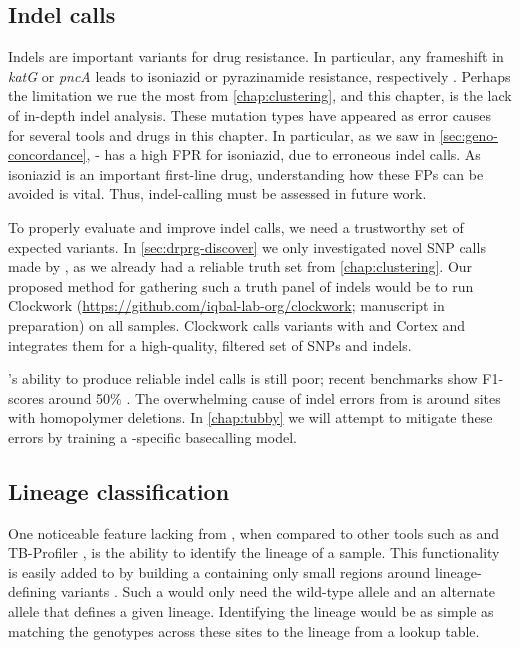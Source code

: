 \subsection{Indel calls}
\label{sec:indel-dst-fw}
Indels are important variants for \mtb{} drug resistance. In particular, any frameshift in \textit{katG} or \textit{pncA} leads to isoniazid or pyrazinamide resistance, respectively \cite{miotto2017}. Perhaps the limitation we rue the most from \autoref{chap:clustering}, and this chapter, is the lack of in-depth indel analysis. These mutation types have appeared as error causes for several tools and drugs in this chapter. In particular, as we saw in \autoref{sec:geno-concordance}, \mykrobe{}-\ont{} has a high FPR for isoniazid, due to erroneous indel calls. As isoniazid is an important first-line drug, understanding how these FPs can be avoided is vital. Thus, indel-calling must be assessed in future work.

To properly evaluate and improve indel calls, we need a trustworthy set of expected variants. In \autoref{sec:drprg-discover} we only investigated novel SNP calls made by \drprg{}, as we already had a reliable truth set from \autoref{chap:clustering}. Our proposed method for gathering such a truth panel of indels would be to run Clockwork (\url{https://github.com/iqbal-lab-org/clockwork}; manuscript in preparation) on all samples. Clockwork calls variants with  and Cortex and integrates them for a high-quality, filtered set of SNPs and indels.

\ont{}'s ability to produce reliable indel calls is still poor; recent benchmarks show F1-scores around 50\% \cite{clairvoyant2019}. The overwhelming cause of indel errors from \ont{} is around sites with homopolymer deletions. In \autoref{chap:tubby} we will attempt to mitigate these errors by training a \mtb{}-specific \ont{} basecalling model.

\subsection{Lineage classification}

One noticeable feature lacking from \drprg{}, when compared to other tools such as \mykrobe{} and TB-Profiler \cite{phelan2019}, is the ability to identify the lineage of a sample. This functionality is easily added to \drprg{} by building a \panrg{} containing only small regions around lineage-defining variants \cite{Shitikov2017,Rutaihwa2019,stucki2016,Freschi2020}. Such a \panrg{} would only need the wild-type allele and an alternate allele that defines a given lineage. Identifying the lineage would be as simple as matching the genotypes across these sites to the lineage from a lookup table.

